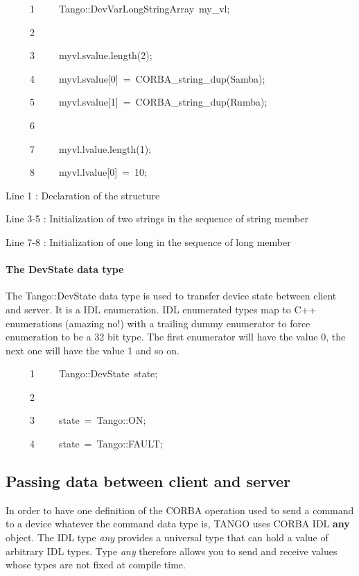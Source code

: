 
\begin{lyxcode}
~~~~~1~~~~~Tango::DevVarLongStringArray~my\_vl;

~~~~~2~~

~~~~~3~~~~~myvl.svalue.length(2);

~~~~~4~~~~~myvl.svalue{[}0{]}~=~CORBA\_string\_dup(\textquotedbl{}Samba\textquotedbl{});

~~~~~5~~~~~myvl.svalue{[}1{]}~=~CORBA\_string\_dup(\textquotedbl{}Rumba\textquotedbl{});

~~~~~6~~

~~~~~7~~~~~myvl.lvalue.length(1);

~~~~~8~~~~~myvl.lvalue{[}0{]}~=~10;
\end{lyxcode}


Line 1 : Declaration of the structure

Line 3-5 : Initialization of two strings in the sequence of string
member

Line 7-8 : Initialization of one long in the sequence of long member

\paragraph{The DevState data type}

The Tango::DevState data type is used to transfer
device state between client and server. It is a IDL enumeration. IDL
enumerated types map to C++ enumerations (amazing no!) with a trailing
dummy enumerator to force enumeration to be a 32 bit type. The first
enumerator will have the value 0, the next one will have the value
1 and so on.


\begin{lyxcode}
~~~~~1~~~~~Tango::DevState~state;

~~~~~2~~

~~~~~3~~~~~state~=~Tango::ON;

~~~~~4~~~~~state~=~Tango::FAULT;
\end{lyxcode}


\subsection{Passing data between client and server}

In order to have one definition of the CORBA operation used to send
a command to a device whatever the command data type is, TANGO uses
CORBA IDL \textbf{any} object. The IDL type \emph{any}
provides a universal type that can hold a value of arbitrary IDL types.
Type \emph{any} therefore allows you to send and receive values whose
types are not fixed at compile time.

